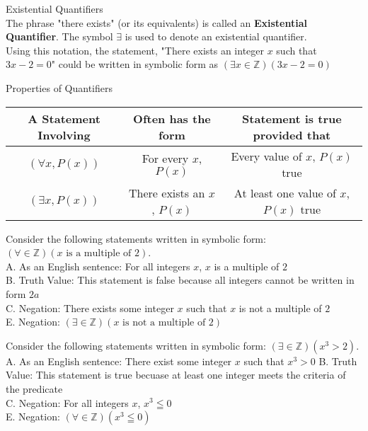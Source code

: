 \begin{definition}
Existential Quantifiers \\

The phrase "there exists" (or its equivalents) is called an {\bf Existential Quantifier}. The symbol $\exists$ is used to denote an existential quantifier. \\
Using this notation, the statement, "There exists an integer $x$ such that $3x - 2 = 0$" could be written in symbolic form as $(\exists x \in \mathbb{Z})(3x - 2 = 0)$
\end{definition} 


\begin{definition}
Properties of Quantifiers \\

\begin{center}
	\begin{tabular}{|c|c|c|}
		\hline 
		{\bf A Statement Involving} & {\bf Often has the form} & {\bf Statement is true provided that} \\ 
		\hline 
		$(\forall x, P(x))$ & For every $x$, $P(x)$ & Every value of $x$, $P(x)$ true \\ 
		\hline 
		$(\exists x, P(x))$ & There exists an $x$, $P(x)$ & At least one value of $x$, $P(x)$ true \\  
		\hline 
	\end{tabular} 
\end{center}
\end{definition}



\begin{example}
Consider the following statements written in symbolic form: $(\forall \in \mathbb{Z})(x \text{ is a multiple of }2)$. \\
A. As an English sentence: For all integers $x$, $x$ is a multiple of $2$ \\
B. Truth Value: This statement is false because all integers cannot be written in form $2a$ \\
C. Negation: There exists some integer $x$ such that $x$ is not a multiple of $2$ \\
E. Negation: $(\exists \in \mathbb{Z})(x \text{ is not a multiple of }2)$ \\
\end{example}


\begin{example}
Consider the following statements written in symbolic form: $(\exists \in \mathbb{Z})(x^3 > 2)$. \\
A. As an English sentence: There exist some integer $x$ such that $x^3 > 0$
B. Truth Value: This statement is true becuase at least one integer meets the criteria of the predicate \\
C. Negation: For all integers $x$, $x^3 \leqq 0$ \\
E. Negation: $(\forall \in \mathbb{Z})(x^3 \leqq 0)$ \\
\end{example}


